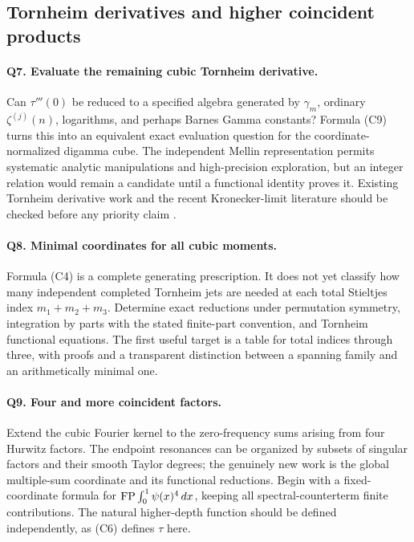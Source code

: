 \subsection{Tornheim derivatives and higher coincident products}

\paragraph{Q7. Evaluate the remaining cubic Tornheim derivative.}
Can $\tau'''(0)$ be reduced to a specified algebra generated by
$\gamma_m$, ordinary $\zeta^{(j)}(n)$, logarithms, and perhaps Barnes
Gamma constants? Formula (C9) turns this into an equivalent exact
evaluation question for the coordinate-normalized digamma cube.
The independent Mellin representation permits systematic analytic
manipulations and high-precision exploration, but an integer relation
would remain a candidate until a functional identity proves it.
Existing Tornheim derivative work and the recent Kronecker-limit
literature should be checked before any priority claim
\cite{BorweinDilcher,BaileyBorwein,Onodera2021,SS2026}.

\paragraph{Q8. Minimal coordinates for all cubic moments.}
Formula (C4) is a complete generating prescription. It does not yet
classify how many independent completed Tornheim jets are needed at
each total Stieltjes index $m_1+m_2+m_3$. Determine exact reductions
under permutation symmetry, integration by parts with the stated
finite-part convention, and Tornheim functional equations. The
first useful target is a table for total indices through three,
with proofs and a transparent distinction between a spanning family
and an arithmetically minimal one.

\paragraph{Q9. Four and more coincident factors.}
Extend the cubic Fourier kernel to the zero-frequency sums arising
from four Hurwitz factors. The endpoint resonances can be organized
by subsets of singular factors and their smooth Taylor degrees;
the genuinely new work is the global multiple-sum coordinate and its
functional reductions. Begin with a fixed-coordinate formula for
$\operatorname{FP}\int_0^1\psi(x)^4\,dx$, keeping all spectral-counterterm finite
contributions. The natural higher-depth function should be defined
independently, as (C6) defines $\tau$ here.

